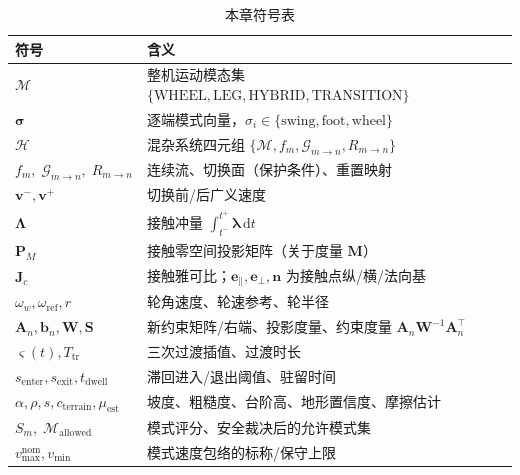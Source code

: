 \begin{table}[H]\centering\small
\caption{本章符号表}
\label{tab:wlm-symbols}
\begin{tabular}{ll}
\toprule
符号 & 含义 \\
\midrule
$\mathcal M$ & 整机运动模态集 $\{\mathrm{WHEEL},\mathrm{LEG},\mathrm{HYBRID},\mathrm{TRANSITION}\}$ \\
$\boldsymbol\sigma$ & 逐端模式向量，$\sigma_i\in\{\mathrm{swing},\mathrm{foot},\mathrm{wheel}\}$ \\
$\mathcal H$ & 混杂系统四元组 $\{\mathcal M,f_m,\mathcal G_{m\to n},R_{m\to n}\}$ \\
$f_m,\;\mathcal G_{m\to n},\;R_{m\to n}$ & 连续流、切换面（保护条件）、重置映射 \\
$\mathbf v^-,\mathbf v^+$ & 切换前/后广义速度 \\
$\boldsymbol\Lambda$ & 接触冲量 $\int_{t^-}^{t^+}\boldsymbol\lambda\,\mathrm dt$ \\
$\mathbf P_M$ & 接触零空间投影矩阵（关于度量 $\mathbf M$） \\
$\mathbf J_c$ & 接触雅可比；$\mathbf e_\parallel,\mathbf e_\perp,\mathbf n$ 为接触点纵/横/法向基 \\
$\omega_w,\omega_{\mathrm{ref}},r$ & 轮角速度、轮速参考、轮半径 \\
$\mathbf A_n,\mathbf b_n,\mathbf W,\mathbf S$ & 新约束矩阵/右端、投影度量、约束度量 $\mathbf A_n\mathbf W^{-1}\mathbf A_n^\top$ \\
$\varsigma(t),T_{\mathrm{tr}}$ & 三次过渡插值、过渡时长 \\
$s_{\mathrm{enter}},s_{\mathrm{exit}},t_{\mathrm{dwell}}$ & 滞回进入/退出阈值、驻留时间 \\
$\alpha,\rho,s,c_{\mathrm{terrain}},\mu_{\mathrm{est}}$ & 坡度、粗糙度、台阶高、地形置信度、摩擦估计 \\
$S_m,\;\mathcal M_{\mathrm{allowed}}$ & 模式评分、安全裁决后的允许模式集 \\
$v_{\max}^{\mathrm{nom}},v_{\min}$ & 模式速度包络的标称/保守上限 \\
\bottomrule
\end{tabular}
\end{table}

